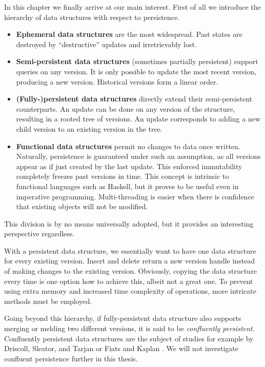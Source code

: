 In this chapter we finally arrive at our main interest. First of all we introduce the hierarchy of data structures with respect to persistence.

\begin{itemize}
\item {\bfseries Ephemeral data structures} are the most widespread. 
Past states are destroyed by ``destructive” updates and irretrievably lost.
\item {\bfseries Semi-persistent data structures} (sometimes partially persistent) 
support queries on any version. It is only possible to update the most recent version, producing a new version. 
Historical versions form a linear order. 
\item {\bfseries (Fully-)persistent data structures} directly extend their semi-persistent counterparts. 
An update can be done on any version of the structure, resulting in a rooted tree of versions. 
An update corresponds to adding a new child version to an existing version in the tree.
\item {\bfseries Functional data structures} permit no changes to data once written. 
Naturally, persistence is guaranteed under such an assumption, 
as all versions appear as if just created by the last update.
This enforced immutability completely freezes past versions in time.
This concept is intrinsic to functional languages such as Haskell, 
but it proves to be useful even in imperative programming. 
Multi-threading is easier when there is confidence that existing objects will not be modified.
\end{itemize}

This division is by no means universally adopted, but it provides an interesting perspective regardless.

With a persistent data structure, we essentially want to have one data structure for every existing version. 
Insert and delete return a new version handle instead of making changes to the existing version. 
Obviously, copying the data structure every time is one option how to achieve this, albeit not a great one. 
To prevent using extra memory and increased time complexity of operations, more intricate methods must be employed.

Going beyond this hierarchy, if fully-persistent data structure also supports merging or melding two different versions, it is said to be \emph{confluently persistent}. 
Confluently persistent data structures are the subject of studies for example by Driscoll, Sleator, and Tarjan \cite{confluently-persistent-a} or Fiats and Kaplan \cite{confluently-persistent-b}. 
We will not investigate confluent persistence further in this thesis.

